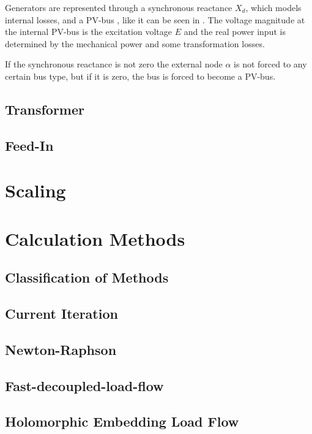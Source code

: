 Generators are represented through a synchronous reactance $X_d$, which models internal losses, and a PV-bus \citep[p. 55]{powerSystemAnalysis}, like it can be seen in . The voltage magnitude at the internal PV-bus is the excitation voltage $E$ and the real power input is determined by the mechanical power and some transformation losses. 

If the synchronous reactance is not zero the external node $\alpha$ is not forced to any certain bus type, but if it is zero, the bus is forced to become a PV-bus.

\subsection{Transformer}

\subsection{Feed-In}

\section{Scaling}

\section{Calculation Methods}

\subsection{Classification of Methods}

\subsection{Current Iteration}
\label{sec:current_iteration}

\subsection{Newton-Raphson}
\label{sec:newton_raphson}

\subsection{Fast-decoupled-load-flow}
\label{sec:fdlf}

\subsection{Holomorphic Embedding Load Flow}
\label{sec:helm}

